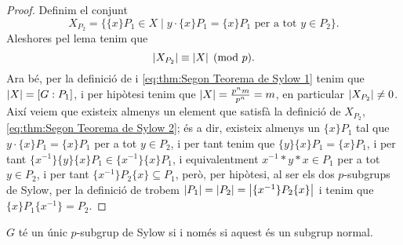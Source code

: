 \documentclass[../Apunts.tex]{subfiles}
\begin{document}
\begin{theorem}
\begin{proof}
			Definim el conjunt
			\begin{equation}
		\label{eq:thm:Segon Teorema de Sylow 2}
			X_{P_{2}}=\{\{x\}P_{1}\in X\mid y\cdot\{x\}P_{1}=\{x\}P_{1}\text{ per a tot }y\in P_{2}\}.
			\end{equation}
			Aleshores pel lema  tenim que
			\begin{equation*}
			\abs{X_{P_{2}}}\equiv\abs{X}\pmod{p}.
			\end{equation*}
			Ara bé, per la definició de  i \eqref{eq:thm:Segon Teorema de Sylow 1} tenim que \(\abs{X}=[G:P_{1}]\), i per hipòtesi tenim que \(\abs{X}=\frac{p^{n}m}{p^{n}}=m\), en particular \(\abs{X_{P_{2}}}\neq0\). Així veiem que existeix almenys un element que satisfà la definició de \(X_{P_{2}}\), \eqref{eq:thm:Segon Teorema de Sylow 2}; és a dir, existeix almenys un \(\{x\}P_{1}\) tal que \(y\cdot\{x\}P_{1}=\{x\}P_{1}\) per a tot \(y\in P_{2}\), i per tant tenim que \(\{y\}\{x\}P_{1}=\{x\}P_{1}\), i per tant \(\{x^{-1}\}\{y\}\{x\}P_{1}\in \{x^{-1}\}\{x\}P_{1}\), i equivalentment \(x^{-1}\ast y\ast x\in P_{1}\) per a tot \(y\in P_{2}\), i per tant \(\{x^{-1}\}P_{2}\{x\}\subseteq P_{1}\), però, per hipòtesi, al ser els dos \(p\)-subgrups de Sylow, per la definició de  trobem \(\abs{P_{1}}=\abs{P_{2}}=\abs{\{x^{-1}\}P_{2}\{x\}}\) i tenim que \(\{x\}P_{1}\{x^{-1}\}=P_{2}\).
		\end{proof}
	\end{theorem}
	\begin{corollary}
		\label{corollary:Segon Teorema de Sylow}
		\(G\) té un únic \(p\)-subgrup de Sylow si i només si aquest és un subgrup normal.
	\end{corollary}
\end{document}
